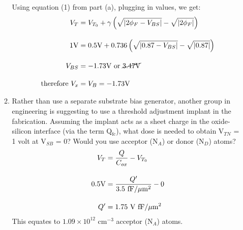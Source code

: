 \documentclass[11pt]{article}
\begin{document}
\begin{enumerate}
\begin{enumerate}
        Using equation (1) from part (a), plugging in values, we get:
        \begin{align*}
            V_T &= V_{T_0} + \gamma \left(\sqrt{|2 \phi_F - V_{BS}|}-\sqrt{|2 \phi_F|}\right)\\[1em]
            1 \text{V} &= 0.5 \text{V} + 0.736 \left(\sqrt{|0.87 - V_{BS}|}-\sqrt{|0.87|}\right)\\[1em]
            V_{BS} &= -1.73 \text{V} \text{ or } \cancel{3.47 \text{V}}\\[1em]
            \text{therefore } V_x &= V_B = -1.73 \text{V}
        \end{align*}
        \item Rather than use a separate substrate bias generator, another group in engineering is suggesting to use a threshold adjustment implant in the fabrication. Assuming the implant acts as a sheet charge in the oxide-silicon interface (via the term Q\(_{\text{fc}}\)), what dose is needed to obtain V\(_{TN}\) = 1 volt at V\(_{SB}\) = 0? Would you use acceptor (N\(_A\)) or donor (N\(_D\)) atoms?
        \begin{align}
            V_T &= \frac{Q}{C_{ox}} - V_{T_0}\\[1em]
            \notag 0.5 \text{V} &= \frac{Q'}{3.5 \text{ fF}/\mu \text{m}^2} - 0\\[1em]
            \notag Q' &= 1.75 \text{ V fF}/\mu \text{m}^2
        \end{align}
        This equates to \(1.09 \times 10^{12}\) cm\(^{-3}\) acceptor (N\(_A\)) atoms.
    \end{enumerate}
\end{enumerate}
\end{document}
